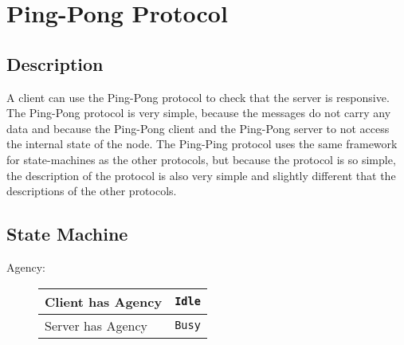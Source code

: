 \documentclass{report}
\newcommand{\hsref}[1]{} %
\newcommand{\state}[1]{\texttt{#1}}
\newcommand{\msg}[1]{\texttt{#1}}
\newcommand{\Idle}{\state{Idle}}
\newcommand{\Busy}{\state{Busy}}
\newcommand{\Done}{\state{Done}}
\newcommand{\MsgDone}{\msg{MsgDone}}
\theoremstyle{definition}{
  \newtheorem{lemma}{Lemma}[section] %
  \newtheorem{definition}[lemma]{Definition}
}
\theoremstyle{theorem}{
  \newtheorem{invariant}[lemma]{Invariant}
  \newtheorem{proofobligation}[lemma]{Proof Obligation}
}
\numberwithin{equation}{lemma}
\begin{document}
\section{Ping-Pong Protocol}
\label{ping-pong-protocol}
\hsref{typed-protocols/src/Network/TypedProtocol/PingPong/Type.hs}
\newcommand{\Ping}{\msg{Ping}}
\newcommand{\Pong}{\msg{Pong}}

\subsection{Description}
A client can use the Ping-Pong protocol to check that the server is responsive.
The Ping-Pong protocol is very simple, because the messages do not carry any data and
because the Ping-Pong client and the Ping-Pong server to not access the internal state of the node.
The Ping-Ping protocol uses the same framework for state-machines as the other protocols,
but because the protocol is so simple, the description of the protocol is also very simple and slightly
different that the descriptions of the other protocols.

\subsection{State Machine}


Agency:

\begin{figure}[H]
\begin{tabular}{|l|l|} \hline
  Client has Agency & \Idle \\  \hline
  Server has Agency & \Busy \\  \hline
\end{tabular}
\end{figure}
\end{document}
